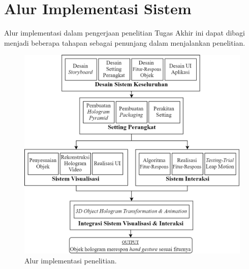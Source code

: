 \section{Alur Implementasi Sistem}
\vspace{1ex}
	Alur implementasi dalam pengerjaan penelitian Tugas Akhir ini dapat dibagi menjadi beberapa tahapan sebagai penunjang dalam menjalankan penelitian.
	\begin{figure} [H]
		\includegraphics[width=\textwidth]{img/bab3/metodologi.png}
		\caption{Alur implementasi penelitian.}
		\label{fig:metodologi}
	\end{figure}

